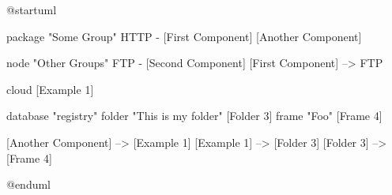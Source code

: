 @startuml

package "Some Group" {
  HTTP - [First Component]
  [Another Component]
}

node "Other Groups" {
  FTP - [Second Component]
  [First Component] --> FTP
}

cloud {
  [Example 1]
}


database "registry" {
  folder "This is my folder" {
    [Folder 3]
  }
  frame "Foo" {
    [Frame 4]
  }
}


[Another Component] --> [Example 1]
[Example 1] --> [Folder 3]
[Folder 3] --> [Frame 4]

@enduml
